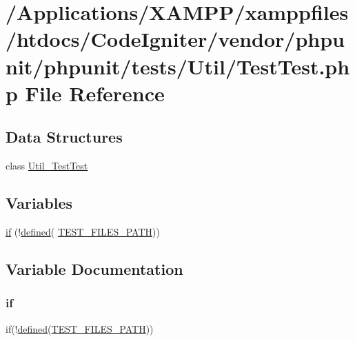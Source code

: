 \hypertarget{_test_test_8php}{}\section{/\+Applications/\+X\+A\+M\+P\+P/xamppfiles/htdocs/\+Code\+Igniter/vendor/phpunit/phpunit/tests/\+Util/\+Test\+Test.php File Reference}
\label{_test_test_8php}
\subsection*{Data Structures}
\begin{DoxyCompactItemize}
\item 
class \mbox{\hyperlink{class_util___test_test}{Util\+\_\+\+Test\+Test}}
\end{DoxyCompactItemize}
\subsection*{Variables}
\begin{DoxyCompactItemize}
\item 
\mbox{\hyperlink{_test_test_8php_a107bc088eea0dce8972b45c841f5ff9c}{if}} (!\mbox{\hyperlink{password_8php_a74f41c0efe4435fb8ac2133464d3cd57}{defined}}( \textquotesingle{}\mbox{\hyperlink{phpunit_2php-token-stream_2tests_2bootstrap_8php_a1e6de45925d7e2f1cacda3975d501df0}{T\+E\+S\+T\+\_\+\+F\+I\+L\+E\+S\+\_\+\+P\+A\+TH}}\textquotesingle{}))
\end{DoxyCompactItemize}


\subsection{Variable Documentation}
\mbox{\label{_test_test_8php_a107bc088eea0dce8972b45c841f5ff9c}} 
\subsubsection{\texorpdfstring{if}{if}}
{\footnotesize\ttfamily if(!\mbox{\hyperlink{password_8php_a74f41c0efe4435fb8ac2133464d3cd57}{defined}}(\textquotesingle{}\mbox{\hyperlink{phpunit_2php-token-stream_2tests_2bootstrap_8php_a1e6de45925d7e2f1cacda3975d501df0}{T\+E\+S\+T\+\_\+\+F\+I\+L\+E\+S\+\_\+\+P\+A\+TH}}\textquotesingle{}))}

